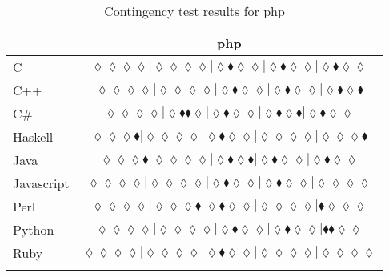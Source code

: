 \begin{table*}
\centering
\begin{tabular}{l c}
& {\sc php} \\
\hline

C & $\scriptscriptstyle\lozenge\lozenge\lozenge\lozenge|\lozenge\lozenge\lozenge\lozenge|\lozenge\blacklozenge\lozenge\lozenge|\lozenge\blacklozenge\lozenge\lozenge|\lozenge\blacklozenge\lozenge\lozenge$ \\
C++ & $\scriptscriptstyle\lozenge\lozenge\lozenge\lozenge|\lozenge\lozenge\lozenge\lozenge|\lozenge\blacklozenge\lozenge\lozenge|\lozenge\blacklozenge\lozenge\lozenge|\lozenge\blacklozenge\lozenge\blacklozenge$ \\
C\# & $\scriptscriptstyle\lozenge\lozenge\lozenge\lozenge|\lozenge\blacklozenge\blacklozenge\lozenge|\lozenge\blacklozenge\lozenge\lozenge|\lozenge\blacklozenge\lozenge\blacklozenge|\lozenge\blacklozenge\lozenge\lozenge$ \\
Haskell & $\scriptscriptstyle\lozenge\lozenge\lozenge\blacklozenge|\lozenge\lozenge\lozenge\lozenge|\lozenge\blacklozenge\lozenge\lozenge|\lozenge\lozenge\lozenge\lozenge|\lozenge\lozenge\lozenge\blacklozenge$ \\
Java & $\scriptscriptstyle\lozenge\lozenge\lozenge\blacklozenge|\lozenge\lozenge\lozenge\lozenge|\lozenge\blacklozenge\lozenge\blacklozenge|\lozenge\blacklozenge\lozenge\lozenge|\lozenge\blacklozenge\lozenge\lozenge$ \\
Javascript & $\scriptscriptstyle\lozenge\lozenge\lozenge\lozenge|\lozenge\lozenge\lozenge\lozenge|\lozenge\blacklozenge\lozenge\lozenge|\lozenge\blacklozenge\lozenge\lozenge|\lozenge\lozenge\lozenge\lozenge$ \\
Perl & $\scriptscriptstyle\lozenge\lozenge\lozenge\lozenge|\lozenge\lozenge\lozenge\blacklozenge|\lozenge\blacklozenge\lozenge\lozenge|\lozenge\lozenge\lozenge\lozenge|\blacklozenge\lozenge\lozenge\lozenge$ \\
Python & $\scriptscriptstyle\lozenge\lozenge\lozenge\lozenge|\lozenge\lozenge\lozenge\lozenge|\lozenge\blacklozenge\lozenge\lozenge|\lozenge\blacklozenge\lozenge\lozenge|\blacklozenge\blacklozenge\lozenge\lozenge$ \\
Ruby & $\scriptscriptstyle\lozenge\lozenge\lozenge\lozenge|\lozenge\lozenge\lozenge\lozenge|\lozenge\blacklozenge\lozenge\lozenge|\lozenge\lozenge\lozenge\lozenge|\lozenge\lozenge\lozenge\lozenge$ \\

\hline
& \\
\end{tabular}
\caption{Contingency test results for php}
\label{tbl:contingency-test-results-php}
\end{table*}


